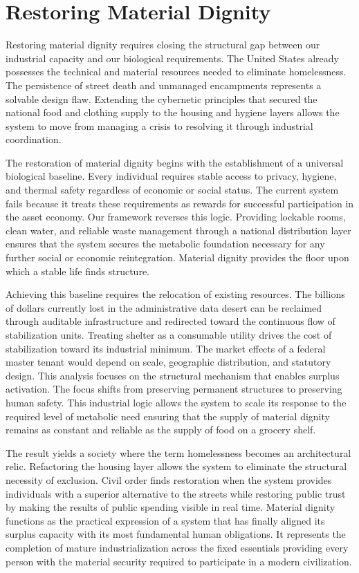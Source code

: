 \documentclass[12pt, letterpaper]{article}
\begin{document}
\section{Restoring Material Dignity}

Restoring material dignity requires closing the structural gap between our industrial capacity and our biological requirements. The United States already possesses the technical and material resources needed to eliminate homelessness. The persistence of street death and unmanaged encampments represents a solvable design flaw. Extending the cybernetic principles that secured the national food and clothing supply to the housing and hygiene layers allows the system to move from managing a crisis to resolving it through industrial coordination.

The restoration of material dignity begins with the establishment of a universal biological baseline. Every individual requires stable access to privacy, hygiene, and thermal safety regardless of economic or social status. The current system fails because it treats these requirements as rewards for successful participation in the asset economy. Our framework reverses this logic. Providing lockable rooms, clean water, and reliable waste management through a national distribution layer ensures that the system secures the metabolic foundation necessary for any further social or economic reintegration. Material dignity provides the floor upon which a stable life finds structure.

Achieving this baseline requires the relocation of existing resources. The billions of dollars currently lost in the administrative data desert can be reclaimed through auditable infrastructure and redirected toward the continuous flow of stabilization units. Treating shelter as a consumable utility drives the cost of stabilization toward its industrial minimum. The market effects of a federal master tenant would depend on scale, geographic distribution, and statutory design. This analysis focuses on the structural mechanism that enables surplus activation. The focus shifts from preserving permanent structures to preserving human safety. This industrial logic allows the system to scale its response to the required level of metabolic need ensuring that the supply of material dignity remains as constant and reliable as the supply of food on a grocery shelf.

The result yields a society where the term homelessness becomes an architectural relic. Refactoring the housing layer allows the system to eliminate the structural necessity of exclusion. Civil order finds restoration when the system provides individuals with a superior alternative to the streets while restoring public trust by making the results of public spending visible in real time. Material dignity functions as the practical expression of a system that has finally aligned its surplus capacity with its most fundamental human obligations. It represents the completion of mature industrialization across the fixed essentials providing every person with the material security required to participate in a modern civilization.
\end{document}
